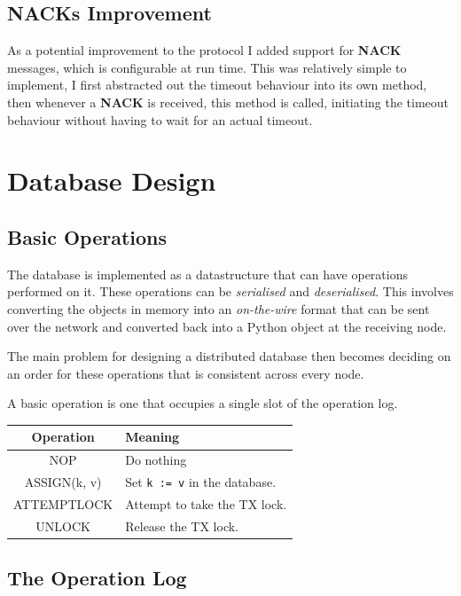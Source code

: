 \documentclass[12pt,twoside,notitlepage]{report}
\newcommand{\msg}[1] {{\bf #1}}         %
\begin{document}
\subsection{NACKs Improvement}

As a potential improvement to the protocol I added support for \msg{NACK} messages, which is
configurable at run time. This was relatively simple to implement, I first abstracted out the
timeout behaviour into its own method, then whenever a \msg{NACK} is received, this method is
called, initiating the timeout behaviour without having to wait for an actual timeout.

\section{Database Design}

\subsection{Basic Operations}

The database is implemented as a datastructure that can have operations performed on it. These
operations can be \emph{serialised} and \emph{deserialised}. This involves converting the objects
in memory into an \emph{on-the-wire} format that can be sent over the network and converted back
into a Python object at the receiving node.

The main problem for designing a distributed database then becomes deciding on an order for these
operations that is consistent across every node.

A basic operation is one that occupies a single slot of the operation log.


\begin{tabular}{ | c | p{7cm} | }
  \hline
  {\bf Operation} & {\bf Meaning} \\ \hline
  NOP & Do nothing \\ \hline
  ASSIGN(k, v) & Set \verb+k := v+ in the database. \\ \hline
  ATTEMPTLOCK & Attempt to take the TX lock. \\ \hline
  UNLOCK & Release the TX lock. \\ \hline
\end{tabular}

\subsection{The Operation Log}
\end{document}
